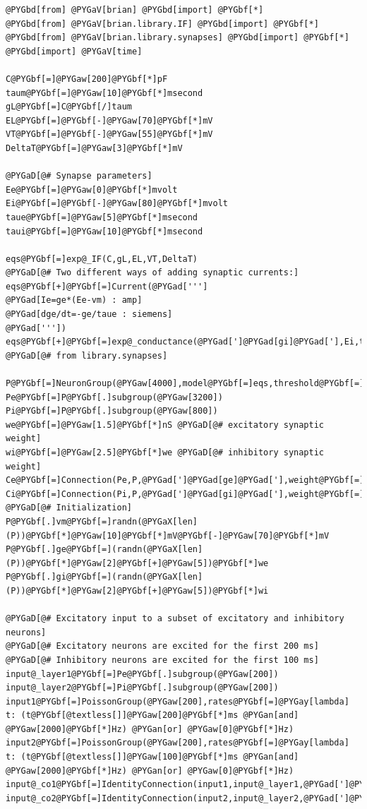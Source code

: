 \documentclass[letterpaper,10pt,english]{manual}
\begin{document}
\begin{Verbatim}[commandchars=@\[\]]
@PYGbd[from] @PYGaV[brian] @PYGbd[import] @PYGbf[*]
@PYGbd[from] @PYGaV[brian.library.IF] @PYGbd[import] @PYGbf[*]
@PYGbd[from] @PYGaV[brian.library.synapses] @PYGbd[import] @PYGbf[*]
@PYGbd[import] @PYGaV[time]

C@PYGbf[=]@PYGaw[200]@PYGbf[*]pF
taum@PYGbf[=]@PYGaw[10]@PYGbf[*]msecond
gL@PYGbf[=]C@PYGbf[/]taum
EL@PYGbf[=]@PYGbf[-]@PYGaw[70]@PYGbf[*]mV
VT@PYGbf[=]@PYGbf[-]@PYGaw[55]@PYGbf[*]mV
DeltaT@PYGbf[=]@PYGaw[3]@PYGbf[*]mV

@PYGaD[@# Synapse parameters]
Ee@PYGbf[=]@PYGaw[0]@PYGbf[*]mvolt
Ei@PYGbf[=]@PYGbf[-]@PYGaw[80]@PYGbf[*]mvolt
taue@PYGbf[=]@PYGaw[5]@PYGbf[*]msecond
taui@PYGbf[=]@PYGaw[10]@PYGbf[*]msecond

eqs@PYGbf[=]exp@_IF(C,gL,EL,VT,DeltaT)
@PYGaD[@# Two different ways of adding synaptic currents:]
eqs@PYGbf[+]@PYGbf[=]Current(@PYGad[''']
@PYGad[Ie=ge*(Ee-vm) : amp]
@PYGad[dge/dt=-ge/taue : siemens]
@PYGad['''])
eqs@PYGbf[+]@PYGbf[=]exp@_conductance(@PYGad[']@PYGad[gi]@PYGad['],Ei,taui) @PYGaD[@# from library.synapses]

P@PYGbf[=]NeuronGroup(@PYGaw[4000],model@PYGbf[=]eqs,threshold@PYGbf[=]@PYGbf[-]@PYGaw[20]@PYGbf[*]mvolt,reset@PYGbf[=]EL,refractory@PYGbf[=]@PYGaw[2]@PYGbf[*]ms)
Pe@PYGbf[=]P@PYGbf[.]subgroup(@PYGaw[3200])
Pi@PYGbf[=]P@PYGbf[.]subgroup(@PYGaw[800])
we@PYGbf[=]@PYGaw[1.5]@PYGbf[*]nS @PYGaD[@# excitatory synaptic weight]
wi@PYGbf[=]@PYGaw[2.5]@PYGbf[*]we @PYGaD[@# inhibitory synaptic weight]
Ce@PYGbf[=]Connection(Pe,P,@PYGad[']@PYGad[ge]@PYGad['],weight@PYGbf[=]we,sparseness@PYGbf[=]@PYGaw[0.05])
Ci@PYGbf[=]Connection(Pi,P,@PYGad[']@PYGad[gi]@PYGad['],weight@PYGbf[=]wi,sparseness@PYGbf[=]@PYGaw[0.05])
@PYGaD[@# Initialization]
P@PYGbf[.]vm@PYGbf[=]randn(@PYGaX[len](P))@PYGbf[*]@PYGaw[10]@PYGbf[*]mV@PYGbf[-]@PYGaw[70]@PYGbf[*]mV
P@PYGbf[.]ge@PYGbf[=](randn(@PYGaX[len](P))@PYGbf[*]@PYGaw[2]@PYGbf[+]@PYGaw[5])@PYGbf[*]we
P@PYGbf[.]gi@PYGbf[=](randn(@PYGaX[len](P))@PYGbf[*]@PYGaw[2]@PYGbf[+]@PYGaw[5])@PYGbf[*]wi

@PYGaD[@# Excitatory input to a subset of excitatory and inhibitory neurons]
@PYGaD[@# Excitatory neurons are excited for the first 200 ms]
@PYGaD[@# Inhibitory neurons are excited for the first 100 ms]
input@_layer1@PYGbf[=]Pe@PYGbf[.]subgroup(@PYGaw[200])
input@_layer2@PYGbf[=]Pi@PYGbf[.]subgroup(@PYGaw[200])
input1@PYGbf[=]PoissonGroup(@PYGaw[200],rates@PYGbf[=]@PYGay[lambda] t: (t@PYGbf[@textless[]]@PYGaw[200]@PYGbf[*]ms @PYGan[and] @PYGaw[2000]@PYGbf[*]Hz) @PYGan[or] @PYGaw[0]@PYGbf[*]Hz)
input2@PYGbf[=]PoissonGroup(@PYGaw[200],rates@PYGbf[=]@PYGay[lambda] t: (t@PYGbf[@textless[]]@PYGaw[100]@PYGbf[*]ms @PYGan[and] @PYGaw[2000]@PYGbf[*]Hz) @PYGan[or] @PYGaw[0]@PYGbf[*]Hz)
input@_co1@PYGbf[=]IdentityConnection(input1,input@_layer1,@PYGad[']@PYGad[ge]@PYGad['],weight@PYGbf[=]we)
input@_co2@PYGbf[=]IdentityConnection(input2,input@_layer2,@PYGad[']@PYGad[ge]@PYGad['],weight@PYGbf[=]we)


\end{Verbatim}
\end{document}
